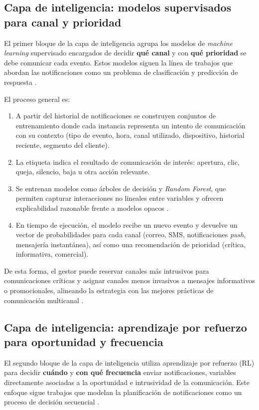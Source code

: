 \documentclass[conference]{IEEEtran}
\begin{document}
\subsection{Capa de inteligencia: modelos supervisados para canal y prioridad}

El primer bloque de la capa de inteligencia agrupa los modelos de \textit{machine learning} supervisado encargados de decidir \textbf{qu{\'e} canal} y con \textbf{qu{\'e} prioridad} se debe comunicar cada evento. Estos modelos siguen la l{\'i}nea de trabajos que abordan las notificaciones como un problema de clasificaci{\'o}n y predicci{\'o}n de respuesta \cite{rahimi2021,yancey2020}.

El proceso general es:
\begin{enumerate}
  \item A partir del historial de notificaciones se construyen conjuntos de entrenamiento donde cada instancia representa un intento de comunicaci{\'o}n con su contexto (tipo de evento, hora, canal utilizado, dispositivo, historial reciente, segmento del cliente).
  \item La etiqueta indica el resultado de comunicaci{\'o}n de inter{\'e}s: apertura, clic, queja, silencio, baja u otra acci{\'o}n relevante.
  \item Se entrenan modelos como {\'a}rboles de decisi{\'o}n y \textit{Random Forest}, que permiten capturar interacciones no lineales entre variables y ofrecen explicabilidad razonable frente a modelos opacos \cite{rahimi2021}.
  \item En tiempo de ejecuci{\'o}n, el modelo recibe un nuevo evento y devuelve un vector de probabilidades para cada canal (correo, SMS, notificaciones \textit{push}, mensajer{\'i}a instant{\'a}nea), as{\'i} como una recomendaci{\'o}n de prioridad (cr{\'i}tica, informativa, comercial).
\end{enumerate}

De esta forma, el gestor puede reservar canales m{\'a}s intrusivos para comunicaciones cr{\'i}ticas y asignar canales menos invasivos a mensajes informativos o promocionales, alineando la estrategia con las mejores pr{\'a}cticas de comunicaci{\'o}n multicanal \cite{torres2020,alzahrani2020}.

\subsection{Capa de inteligencia: aprendizaje por refuerzo para oportunidad y frecuencia}

El segundo bloque de la capa de inteligencia utiliza aprendizaje por refuerzo (RL) para decidir \textbf{cu{\'a}ndo} y \textbf{con qu{\'e} frecuencia} enviar notificaciones, variables directamente asociadas a la oportunidad e intrusividad de la comunicaci{\'o}n. Este enfoque sigue trabajos que modelan la planificaci{\'o}n de notificaciones como un proceso de decisi{\'o}n secuencial \cite{yancey2020,prabhakar2022}.
\end{document}
